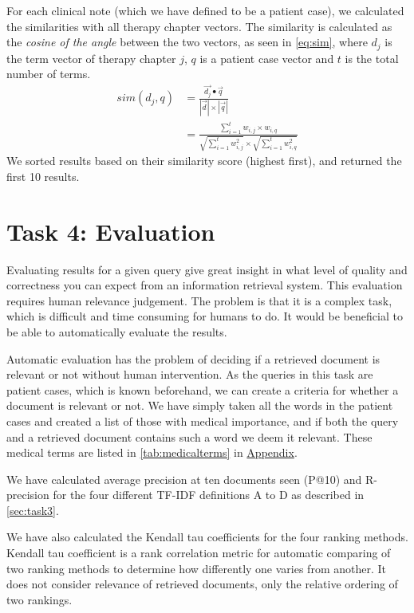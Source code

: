 For each clinical note (which we have defined to be a patient case), we
calculated the similarities with all therapy chapter vectors. The similarity is
calculated as the \emph{cosine of the angle} between the two vectors, as seen
in \autoref{eq:sim}, where \( d_{j} \) is the term vector of therapy chapter \( j \),
\( q \) is a patient case vector and \( t \) is the total number of terms.
\begin{align} \label{eq:sim}
	sim(d_{j}, q) &= \frac{\vec{d_{j}} \bullet \vec{q}}{|\vec{d}| \times |\vec{q}|} \nonumber \\
				  &= \frac{\sum_{i=1}^{t} w_{i,j} \times w_{i,q}}{\sqrt{\sum_{i=1}^{t} w_{i,j}^2} \times \sqrt{\sum_{i=1}^{t} w_{i,q}^2}}
\end{align}
We sorted results based on their similarity score (highest first), and
returned the first 10 results.


\section{Task 4: Evaluation}
\label{sec:task4}
Evaluating results for a given query give great insight in what level of quality
and correctness you can expect from an information retrieval system. This evaluation requires human relevance judgement. 
The problem is that it is a complex task, 
which is difficult and time consuming for humans to
do. It would be beneficial to be able to automatically evaluate the results.

Automatic evaluation has the problem of deciding if a retrieved document
is relevant or not without human intervention. As the queries in this task are patient cases, which is
known beforehand, we can create a criteria for whether a document is relevant
or not. We have simply taken all the words in the patient cases and created a
list of those with medical importance, and if both the query and a retrieved
document contains such a word we deem it relevant. These medical terms are
listed in \autoref{tab:medicalterms} in \hyperref[appendix]{Appendix}.

We have calculated average precision at ten documents seen (P@10) and
R-precision for the four different TF-IDF definitions A to D as described in
\autoref{sec:task3}.

We have also calculated the Kendall tau coefficients for the four ranking
methods. Kendall tau coefficient is a rank correlation metric for automatic
comparing of two ranking methods to determine how differently one varies from
another. It does not consider relevance of retrieved documents, only the
relative ordering of two rankings.



